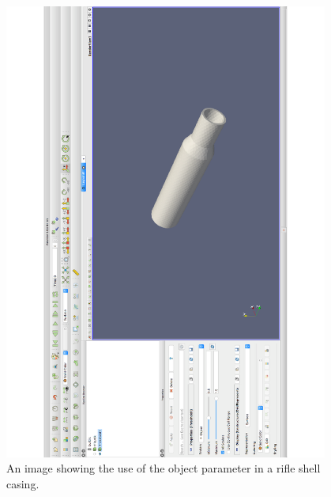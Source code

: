 \begin{figure}[H]
\begin{center}
\includegraphics[width=0.95\textwidth]{Figures/riflethreshold}
\caption{An image showing the use of the object parameter in a rifle shell casing.}\label{fig:riflethreshold}
\end{center}
\end{figure}
